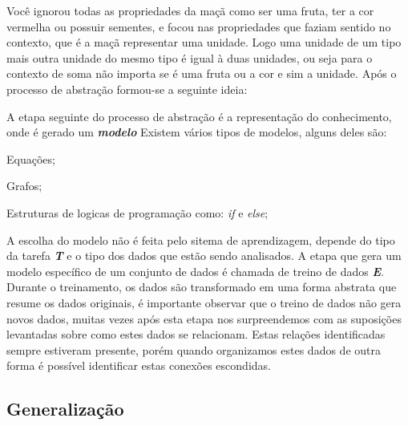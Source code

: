 Você ignorou todas as propriedades da maçã como ser uma fruta, ter a cor vermelha  ou possuir sementes, e focou nas propriedades que faziam sentido no contexto, que é a maçã representar uma unidade. Logo uma unidade de um tipo mais outra unidade do mesmo tipo é igual à duas unidades, ou seja para o contexto de soma não importa se é uma fruta ou a cor e sim a unidade. Após o processo de abstração formou-se a seguinte ideia:


\begin{figure}[ht!]
	\centering
\end{figure}

A etapa seguinte do processo de abstração é a representação do conhecimento, onde é gerado um 
\textbf{\textit{modelo}} 
Existem vários tipos de modelos, alguns deles são:
\begin{alineascomponto}
    \item Equações;
    \item Grafos;
    \item Estruturas de logicas de programação como: \textit{if} e \textit{else}; 
\end{alineascomponto} 

A escolha do modelo não é feita pelo sitema de aprendizagem, depende do tipo da tarefa \textbf{\textit{T}} e o tipo dos dados
que estão sendo analisados. A etapa que gera um modelo específico de um conjunto de dados é chamada de treino de dados \textbf{\textit{E}}. 
Durante o treinamento, os dados são transformado em uma forma abstrata que resume os dados originais, é importante observar que o  
treino de dados não gera novos dados, muitas vezes após esta etapa nos surpreendemos com as suposições levantadas sobre como 
estes dados se relacionam. Estas relações identificadas sempre estiveram presente, porém quando organizamos estes dados de outra forma
é possível identificar estas conexões escondidas.

\subsection{Generalização}
\label{subsec:generalização-dados}

